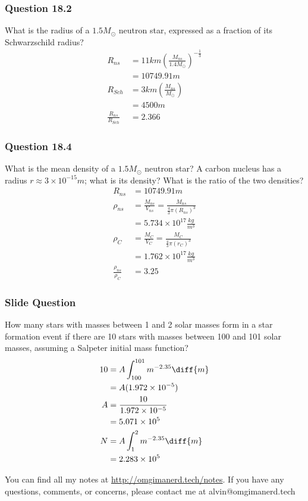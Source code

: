 \documentclass{math}
\begin{document}
\subsubsection*{Question 18.2}
What is the radius of a \( 1.5M_{\odot} \) neutron star, expressed as a
fraction of its Schwarzschild radius?
\begin{align*}
  R_{ns} &= 11km\left(\frac{M_{ns}}{1.4M_{\odot}}\right)^{-\frac{1}{3}} \\
  &= 10749.91m \\
  R_{Sch} &= 3km\left(\frac{M_{ns}}{M_{\odot}}\right) \\
  &= 4500m \\
  \frac{R_{ns}}{R_{Sch}} &= 2.366
\end{align*}

\subsubsection*{Question 18.4}
What is the mean density of a \( 1.5M_{\odot} \) neutron star? A carbon
nucleus has a radius \( r\approx3\times10^{-15}m \); what is its density?
What is the ratio of the two densities?
\begin{align*}
  R_{ns} &= 10749.91m \\
  \rho_{ns} &= \frac{M_{ns}}{V_{ns}} =
    \frac{M_{ns}}{\frac{4}{3}\pi(R_{ns})^3} \\
  &= 5.734\times10^{17}\frac{kg}{m^3} \\
  \rho_{C} &= \frac{M_C}{V_C} =
    \frac{M_C}{\frac{4}{3}\pi(r_C)^3} \\
  &= 1.762\times10^{17}\frac{kg}{m^3} \\
  \frac{\rho_{ns}}{\rho_{C}} &= 3.25
\end{align*}

\subsubsection*{Slide Question}
How many stars with masses between 1 and 2 solar masses form in a star
formation event if there are 10 stars with masses between 100 and 101 solar
masses, assuming a Salpeter initial mass function?
\begin{align*}
  10 &= A\int_{100}^{101}m^{-2.35}\diff{m} \\
  &= A(1.972\times10^{-5}) \\
  A &= \frac{10}{1.972\times10^{-5}} \\
  &= 5.071\times10^5 \\
  N &= A\int_{1}^{2}m^{-2.35}\diff{m} \\
  &= 2.283\times10^5
\end{align*}

\begin{center}
  You can find all my notes at \url{http://omgimanerd.tech/notes}. If you have
  any questions, comments, or concerns, please contact me at
  alvin@omgimanerd.tech
\end{center}
\end{document}
